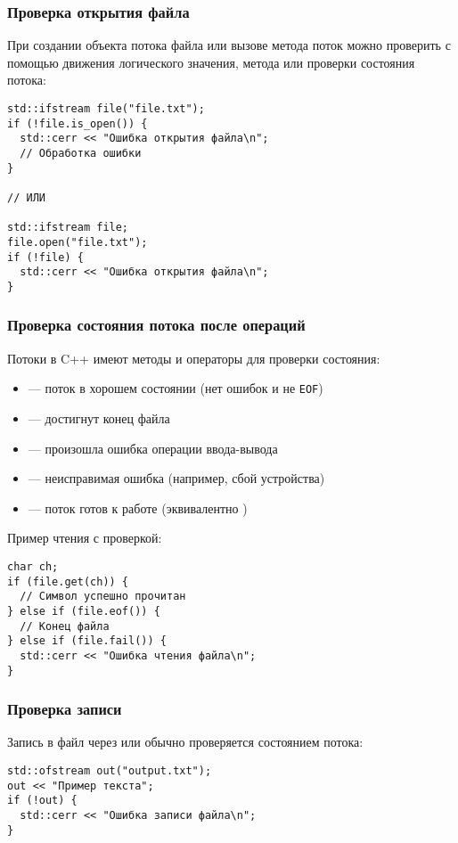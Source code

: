 \subsubsection{Проверка открытия файла}
При создании объекта потока файла или вызове метода  поток можно проверить с помощью движения логического
значения, метода  или проверки состояния потока:
\begin{verbatim}
std::ifstream file("file.txt");
if (!file.is_open()) {
  std::cerr << "Ошибка открытия файла\n";
  // Обработка ошибки
}

// ИЛИ

std::ifstream file;
file.open("file.txt");
if (!file) {
  std::cerr << "Ошибка открытия файла\n";
}
\end{verbatim}

\subsubsection{Проверка состояния потока после операций}
Потоки в C++ имеют методы и операторы для проверки состояния:
\begin{itemize}
\item {} — поток в хорошем состоянии (нет ошибок и не \verb|EOF|)
\item {} — достигнут конец файла
\item {} — произошла ошибка операции ввода-вывода
\item {} — неисправимая ошибка (например, сбой устройства)
\item {} — поток готов к работе (эквивалентно )
\end{itemize}
Пример чтения с проверкой:

\begin{verbatim}
char ch;
if (file.get(ch)) {
  // Символ успешно прочитан
} else if (file.eof()) {
  // Конец файла
} else if (file.fail()) {
  std::cerr << "Ошибка чтения файла\n";
}
\end{verbatim}
\subsubsection{Проверка записи}
Запись в файл через  или  обычно проверяется состоянием потока:
\begin{verbatim}
std::ofstream out("output.txt");
out << "Пример текста";
if (!out) {
  std::cerr << "Ошибка записи файла\n";
}
\end{verbatim}

